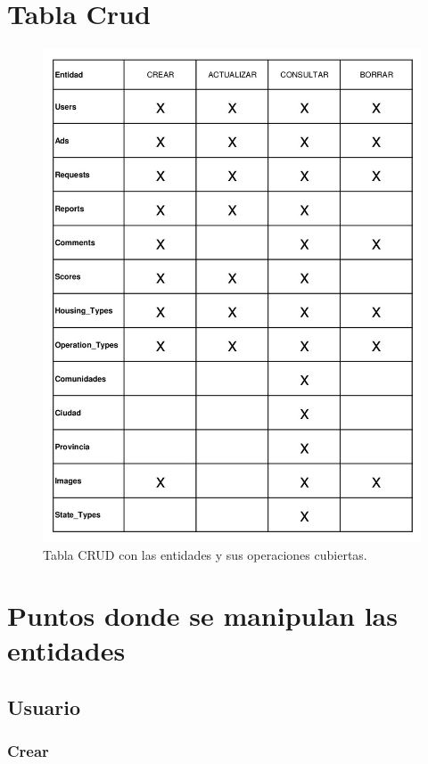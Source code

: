 \chapter{Tabla Crud}


\begin{figure}[h]
\centering
\includegraphics[width=.7\textwidth]{Img/Disenyo/TABLA_CRUD.jpg}
\caption{Tabla CRUD con las entidades y sus operaciones cubiertas.}
\label{fig:dcu}
\end{figure}

\chapter{Puntos donde se manipulan las entidades}

\section{Usuario}
\subsection{Crear}

